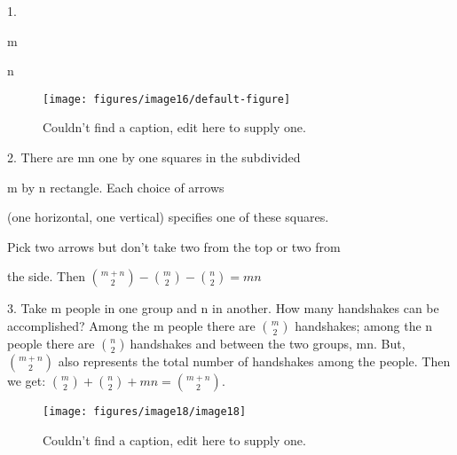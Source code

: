 \documentclass[10pt,letter]{article}
\begin{document}
1.

m

n
\begin{figure}[h!]\begin{center}
\texttt{[image: figures/image16/default-figure]}
\caption{{Couldn't find a caption, edit here to supply one.%
}}
\end{center}
\end{figure}

2.
There are mn one by one squares in the subdivided

m by n rectangle. Each choice of arrows

(one horizontal, one vertical) specifies one of these squares.

Pick two arrows but don't take two from the top or two from

the side. Then \(\binom{m + n}{2}
 -
\binom{m}{2}
 -
\binom{n}{2}
 = mn\)

3. Take m people in one group and n in another. How many handshakes can
be accomplished? Among the m people there are \(\binom{m}{2}
\) handshakes; among the n people there are
\(\binom{n}{2}
\ \)handshakes and between the two groups, mn. But,
\(\binom{m + n}{2}
\) also represents the total number of handshakes among the
people. Then we get: \(\binom{m}{2}
 +
\binom{n}{2}
 + mn =
\binom{m + n}{2}
\).
\begin{figure}[h!]\begin{center}
\texttt{[image: figures/image18/image18]}
\caption{{Couldn't find a caption, edit here to supply one.%
}}
\end{center}
\end{figure}
\end{document}
